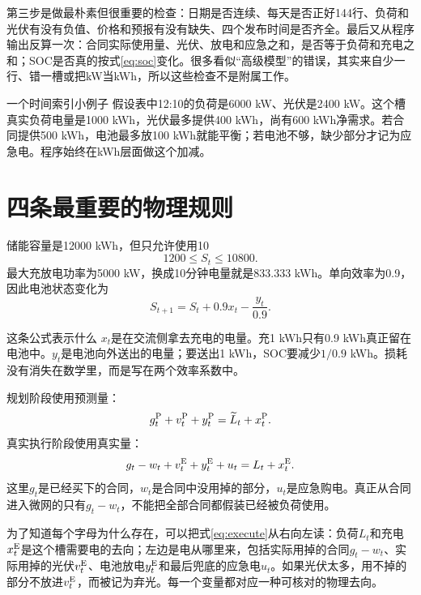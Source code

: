 \documentclass[UTF8,fontset=fandol,a4paper,11pt]{ctexart}
\begin{document}
第三步是做最朴素但很重要的检查：日期是否连续、每天是否正好144行、负荷和光伏有没有负值、价格和预报有没有缺失、四个发布时间是否齐全。最后又从程序输出反算一次：合同实际使用量、光伏、放电和应急之和，是否等于负荷和充电之和；SOC是否真的按式\eqref{eq:soc}变化。很多看似“高级模型”的错误，其实来自少一行、错一槽或把kW当kWh，所以这些检查不是附属工作。

\begin{plainbox}{一个时间索引小例子}
假设表中12:10的负荷是6000 kW、光伏是2400 kW。这个槽真实负荷电量是1000 kWh，光伏最多提供400 kWh，尚有600 kWh净需求。若合同提供500 kWh，电池最多放100 kWh就能平衡；若电池不够，缺少部分才记为应急电。程序始终在kWh层面做这个加减。
\end{plainbox}

\section{四条最重要的物理规则}

储能容量是12000 kWh，但只允许使用10%
\begin{equation}
1200\le S_t\le10800.
\label{eq:socbound}
\end{equation}
最大充放电功率为5000 kW，换成10分钟电量就是833.333 kWh。单向效率为0.9，因此电池状态变化为
\begin{equation}
S_{t+1}=S_t+0.9x_t-\frac{y_t}{0.9}.
\label{eq:soc}
\end{equation}

\begin{plainbox}{这条公式表示什么}
\(x_t\)是在交流侧拿去充电的电量。充1 kWh只有0.9 kWh真正留在电池中。\(y_t\)是电池向外送出的电量；要送出1 kWh，SOC要减少\(1/0.9\) kWh。损耗没有消失在数学里，而是写在两个效率系数中。
\end{plainbox}

规划阶段使用预测量：
\begin{equation}
g_t^{\rm P}+v_t^{\rm P}+y_t^{\rm P}=\widetilde L_t+x_t^{\rm P}.
\label{eq:plan}
\end{equation}
真实执行阶段使用真实量：
\begin{equation}
g_t-w_t+v_t^{\rm E}+y_t^{\rm E}+u_t=L_t+x_t^{\rm E}.
\label{eq:execute}
\end{equation}
这里\(g_t\)是已经买下的合同，\(w_t\)是合同中没用掉的部分，\(u_t\)是应急购电。真正从合同进入微网的只有\(g_t-w_t\)，不能把全部合同都假装已经被负荷使用。

为了知道每个字母为什么存在，可以把式\eqref{eq:execute}从右向左读：负荷\(L_t\)和充电\(x_t^{\rm E}\)是这个槽需要电的去向；左边是电从哪里来，包括实际用掉的合同\(g_t-w_t\)、实际用掉的光伏\(v_t^{\rm E}\)、电池放电\(y_t^{\rm E}\)和最后兜底的应急电\(u_t\)。如果光伏太多，用不掉的部分不放进\(v_t^{\rm E}\)，而被记为弃光。每一个变量都对应一种可核对的物理去向。
\end{document}
